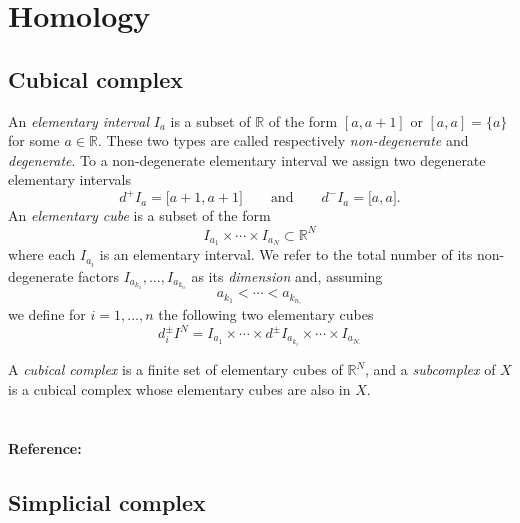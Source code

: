 \documentclass{amsart}
\begin{document}
	\section{Homology}
	
	\subsection*{Cubical complex} \label{cubical_complex}
	
	An \textit{elementary interval} $I_a$ is a subset of $\mathbb{R}$ of the form $[a, a+1]$ or $[a,a] = \{a\}$ for some $a \in \mathbb{R}$. These two types are called respectively \textit{non-degenerate} and \textit{degenerate}. To a non-degenerate elementary interval we assign two degenerate elementary intervals
	\begin{equation*}
	d^+ I_a = \lbrack a+1, a+1 \rbrack \qquad \text{and} \qquad d^- I_a = \lbrack a, a \rbrack.
	\end{equation*}
	An \textit{elementary cube} is a subset of the form 
	\begin{equation*}
	I_{a_1} \times \cdots \times I_{a_N} \subset \mathbb{R}^N
	\end{equation*}
	where each $I_{a_i}$ is an elementary interval. We refer to the total number of its non-degenerate factors $I_{a_{k_1}}, \dots, I_{a_{k_n}}$ as its \textit{dimension} and, assuming
	\begin{equation*}
	a_{k_1} < \cdots < a_{k_{n,}}
	\end{equation*}
	we define for $i = 1, \dots, n$ the following two elementary cubes
	\begin{equation*}
	d_i^\pm I^N = I_{a_1} \times \cdots \times d^\pm I_{a_{k_i}} \times \cdots \times I_{a_{N.}}
	\end{equation*}
	
	A \textit{cubical complex} is a finite set of elementary cubes of $\mathbb{R}^N$, and a \textit{subcomplex} of $X$ is a cubical complex whose elementary cubes are also in $X$.
	
	\paragraph{\\ Reference:} \cite{mischaikow04computational}
	
	\subsection*{Simplicial complex} \label{simplicial_complex}
	
\end{document}
